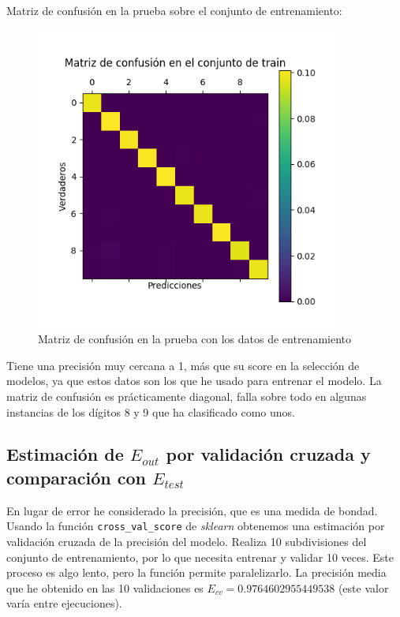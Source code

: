 \documentclass[a4]{article}
\begin{document}
Matriz de confusión en la prueba sobre el conjunto de entrenamiento:
\vspace{-4mm}
\begin{figure}[H]
  \centering
  \includegraphics[width=100mm]{imgs/conf-train.png}
  \caption{Matriz de confusión en la prueba con los datos de
    entrenamiento}
  \label{fig:conf-train}
\end{figure}
\vspace{-4mm}

Tiene una precisión muy cercana a 1, más que su score en la selección
de modelos, ya que estos datos son los que he usado para entrenar el
modelo. La matriz de confusión es prácticamente diagonal, falla sobre
todo en algunas instancias de los dígitos 8 y 9 que ha clasificado
como unos.

\subsection{Estimación de $E_{out}$ por validación cruzada y
  comparación con $E_{test}$}

En lugar de error he considerado la precisión, que es una medida de
bondad. Usando la función \texttt{cross\_val\_score} de
\textit{sklearn} obtenemos una estimación por validación cruzada de la
precisión del modelo. Realiza 10 subdivisiones del conjunto de
entrenamiento, por lo que necesita entrenar y validar 10 veces. Este
proceso es algo lento, pero la función permite paralelizarlo. La
precisión media que he obtenido en las 10 validaciones es
$E_{cv} = 0.9764602955449538$ (este valor varía entre ejecuciones).
\end{document}

